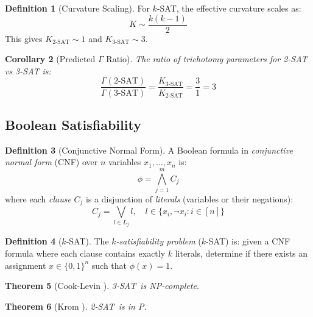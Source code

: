 \documentclass[11pt,a4paper]{article}
\theoremstyle{plain}
\newtheorem{theorem}{Theorem}[section]
\newtheorem{corollary}[theorem]{Corollary}
\theoremstyle{definition}
\newtheorem{definition}[theorem]{Definition}
\theoremstyle{remark}
\newcommand{\twoSAT}{\textsc{2-SAT}}
\newcommand{\threeSAT}{\textsc{3-SAT}}
\begin{document}
\begin{definition}[Curvature Scaling]
For $k$-SAT, the effective curvature scales as:
\begin{equation}
    K \sim \frac{k(k-1)}{2}
\end{equation}
This gives $K_{2\text{-SAT}} \sim 1$ and $K_{3\text{-SAT}} \sim 3$.
\end{definition}

\begin{corollary}[Predicted $\Gamma$ Ratio]
The ratio of trichotomy parameters for 2-SAT vs 3-SAT is:
\begin{equation}
    \frac{\Gamma(\text{2-SAT})}{\Gamma(\text{3-SAT})} = \frac{K_{3\text{-SAT}}}{K_{2\text{-SAT}}} = \frac{3}{1} = 3
\end{equation}
\end{corollary}

\subsection{Boolean Satisfiability}

\begin{definition}[Conjunctive Normal Form]
A Boolean formula in \emph{conjunctive normal form} (CNF) over $n$ variables $x_1, \ldots, x_n$ is:
\begin{equation}
    \phi = \bigwedge_{j=1}^{m} C_j
\end{equation}
where each \emph{clause} $C_j$ is a disjunction of \emph{literals} (variables or their negations):
\begin{equation}
    C_j = \bigvee_{l \in L_j} l, \quad l \in \{x_i, \neg x_i : i \in [n]\}
\end{equation}
\end{definition}

\begin{definition}[$k$-SAT]
The \emph{$k$-satisfiability problem} ($k$-SAT) is: given a CNF formula where each clause contains exactly $k$ literals, determine if there exists an assignment $x \in \{0,1\}^n$ such that $\phi(x) = 1$.
\end{definition}

\begin{theorem}[Cook-Levin \cite{cook1971}]
\threeSAT\ is NP-complete.
\end{theorem}

\begin{theorem}[Krom \cite{krom1967}]
\twoSAT\ is in P.
\end{theorem}
\end{document}

